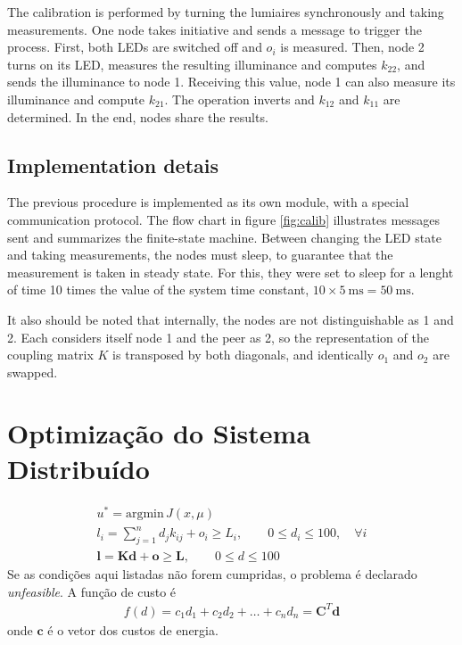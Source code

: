 \documentclass[english,palatino]{ist-report}
\newcommand{\matr}[1]{\mathbf{#1}}
\begin{document}
The calibration is performed by turning the lumiaires synchronously and taking measurements. One node takes initiative and sends a message to trigger the process. First, both LEDs are switched off and $o_i$ is measured.
Then, node 2 turns on its LED, measures the resulting illuminance and computes $k_{22}$, and sends the illuminance to node 1. Receiving this value, node 1 can also measure its illuminance and compute $k_{21}$. The operation inverts and $k_{12}$ and $k_{11}$ are determined. In the end, nodes share the results.

\subsection{Implementation detais}

The previous procedure is implemented as its own module, with a special communication protocol. The flow chart in figure \ref{fig:calib} illustrates messages sent and summarizes the finite-state machine.
Between changing the LED state and taking measurements, the nodes must sleep, to guarantee that the measurement is taken in steady state. For this, they were set to sleep for a lenght of time 10 times the value of the system time constant, $10 \times \SI{5}{\milli \second} = \SI{50}{\milli \second}$. 

It also should be noted that internally, the nodes are not distinguishable as 1 and 2. Each considers itself node 1 and the peer as 2, so the representation of the coupling matrix $K$ is transposed by both diagonals, and identically $o_1$ and $o_2$ are swapped.

\section{Optimização do Sistema Distribuído}

\begin{gather*}
	u^* = \textrm{argmin}\,J(x, \mu) \\
	l_i = \sum^n_{j=1} d_j k_{ij} + o_i \geq L_i, \qquad 0 \leq d_i \leq 100, \quad \forall i \\
	\matr{l} = \matr{K}\matr{d} + \matr{o} \geq \matr{L}, \qquad 0 \leq d \leq 100
\end{gather*}
Se as condições aqui listadas não forem cumpridas, o problema é declarado \textit{unfeasible}. A função de custo é
\begin{gather*}
	f(d) = c_1d_1 + c_2d_2 + \ldots + c_nd_n = \matr{C}^T\matr{d}
\end{gather*}
onde $\matr{c}$ é o vetor dos custos de energia.
\end{document}
